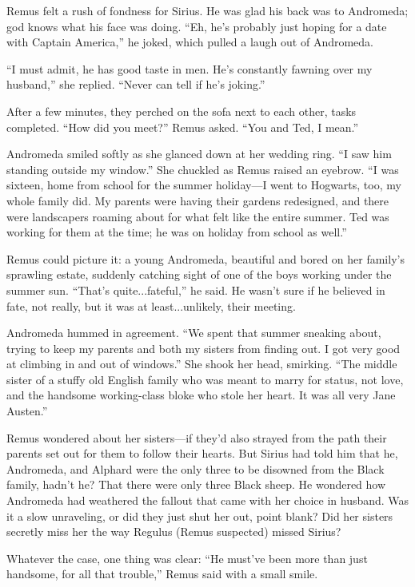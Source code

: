 Remus felt a rush of fondness for Sirius. He was glad his back was to Andromeda; god knows what his face was doing. “Eh, he’s probably just hoping for a date with Captain America,” he joked, which pulled a laugh out of Andromeda.

“I must admit, he has good taste in men. He’s constantly fawning over my husband,” she replied. “Never can tell if he’s joking.”

After a few minutes, they perched on the sofa next to each other, tasks completed. “How did you meet?” Remus asked. “You and Ted, I mean.”

Andromeda smiled softly as she glanced down at her wedding ring. “I saw him standing outside my window.” She chuckled as Remus raised an eyebrow. “I was sixteen, home from school for the summer holiday—I went to Hogwarts, too, my whole family did. My parents were having their gardens redesigned, and there were landscapers roaming about for what felt like the entire summer. Ted was working for them at the time; he was on holiday from school as well.”

Remus could picture it: a young Andromeda, beautiful and bored on her family’s sprawling estate, suddenly catching sight of one of the boys working under the summer sun. “That’s quite...fateful,” he said. He wasn’t sure if he believed in fate, not really, but it was at least...unlikely, their meeting.

Andromeda hummed in agreement. “We spent that summer sneaking about, trying to keep my parents and both my sisters from finding out. I got very good at climbing in and out of windows.” She shook her head, smirking. “The middle sister of a stuffy old English family who was meant to marry for status, not love, and the handsome working-class bloke who stole her heart. It was all very Jane Austen.”

Remus wondered about her sisters—if they’d also strayed from the path their parents set out for them to follow their hearts. But Sirius had told him that he, Andromeda, and Alphard were the only three to be disowned from the Black family, hadn’t he? That there were only three Black sheep. He wondered how Andromeda had weathered the fallout that came with her choice in husband. Was it a slow unraveling, or did they just shut her out, point blank? Did her sisters secretly miss her the way Regulus (Remus suspected) missed Sirius?

Whatever the case, one thing was clear: “He must’ve been more than just handsome, for all that trouble,” Remus said with a small smile.

